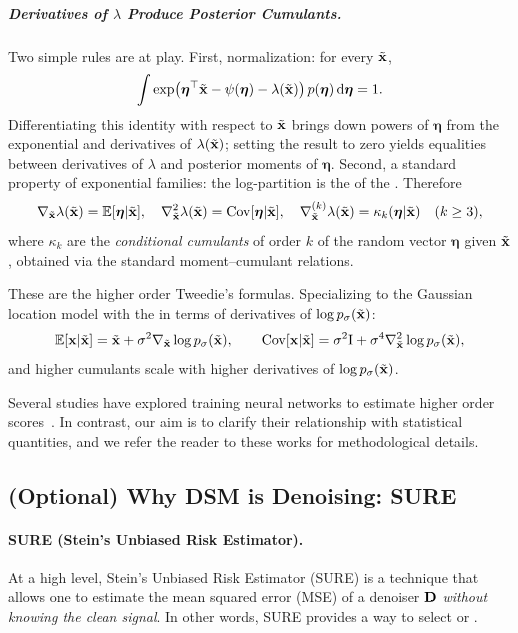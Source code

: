 \subparagraph{Derivatives of $\lambda$ Produce Posterior Cumulants.}
Two simple rules are at play.
First, normalization: for every $\tilde{{\mathbf{x}}}$,
\[
\int \exp\!\big(\boldsymbol\eta^\top \tilde{{\mathbf{x}}}-\psi(\boldsymbol\eta)-\lambda(\tilde{{\mathbf{x}}})\big)\,p(\boldsymbol\eta)\mathop{}\!\mathrm{d}\boldsymbol\eta
=1.
\]
Differentiating this identity with respect to $\tilde{{\mathbf{x}}}$ brings down powers of $\boldsymbol\eta$ from the exponential and derivatives of $\lambda(\tilde{{\mathbf{x}}})$; setting the result to zero yields equalities between derivatives of $\lambda$ and posterior moments of $\boldsymbol\eta$.
Second, a standard property of exponential families: the log-partition is the  of the .
Therefore
\[
\nabla_{\tilde{{\mathbf{x}}}}\lambda(\tilde{{\mathbf{x}}})=\mathbb{E}[\boldsymbol\eta|\tilde{{\mathbf{x}}}],\quad
\nabla_{\tilde{{\mathbf{x}}}}^{2}\lambda(\tilde{{\mathbf{x}}})=\mathrm{Cov}[\boldsymbol\eta|\tilde{{\mathbf{x}}}],\quad
\nabla_{\tilde{{\mathbf{x}}}}^{(k)}\lambda(\tilde{{\mathbf{x}}})=\kappa_k(\boldsymbol\eta|\tilde{{\mathbf{x}}})\quad(k\ge 3),
\]
where $\kappa_k$ are the \emph{conditional cumulants} of order $k$ of the random vector $\boldsymbol\eta$ given $\tilde{{\mathbf{x}}}$, obtained via the standard moment–cumulant relations.


These are the higher order Tweedie's formulas.
Specializing to the Gaussian location model with  the  in terms of derivatives of $\log p_\sigma(\tilde{{\mathbf{x}}})$:
\[
\mathbb{E}[{\mathbf{x}}|\tilde{{\mathbf{x}}}]
=\tilde{{\mathbf{x}}}+\sigma^2\nabla_{\tilde{{\mathbf{x}}}}\log p_\sigma(\tilde{{\mathbf{x}}}),
\qquad
\mathrm{Cov}[{\mathbf{x}}|\tilde{{\mathbf{x}}}]
=\sigma^2\mathrm I+\sigma^4\nabla_{\tilde{{\mathbf{x}}}}^{2}\log p_\sigma(\tilde{{\mathbf{x}}}),
\]
and higher cumulants scale with higher derivatives of $\log p_\sigma(\tilde{{\mathbf{x}}})$.


Several studies have explored training neural networks to estimate higher order scores~\citep{meng2021estimating,lu2022maximum,lai2023fp}. In contrast, our aim is to clarify their relationship with statistical quantities, and we refer the reader to these works for methodological details.

\subsection{(Optional) Why DSM is Denoising: SURE}\label{subsec:why-dsm-denoising-sure}


\paragraph{SURE (Stein’s Unbiased Risk Estimator).}
At a high level, Stein’s Unbiased Risk Estimator (SURE) is a technique that allows one to 
estimate the mean squared error (MSE) of a denoiser ${\mathbf{D}}$ \emph{without knowing the clean signal}. 
In other words, SURE provides a way to select or .

